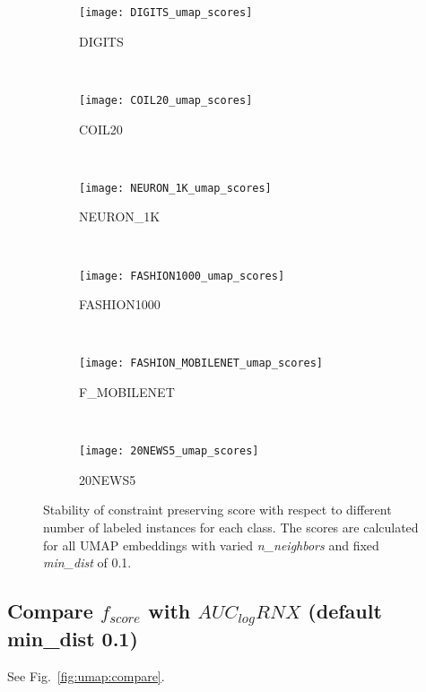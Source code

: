\begin{figure*}[pos=h]
    \centering
    \begin{subfigure}[b]{0.152\textwidth}
        \centering
        \texttt{[image: DIGITS\_umap\_scores]}
        \caption{DIGITS}
    \end{subfigure}
    ~
    \begin{subfigure}[b]{0.152\textwidth}
        \texttt{[image: COIL20\_umap\_scores]}
        \caption{COIL20}
    \end{subfigure}
    ~
    \begin{subfigure}[b]{0.152\textwidth}
        \texttt{[image: NEURON\_1K\_umap\_scores]}
        \caption{NEURON\_1K}
    \end{subfigure}
    ~
    \begin{subfigure}[b]{0.152\textwidth}
        \centering
        \texttt{[image: FASHION1000\_umap\_scores]}
        \caption{FASHION1000}
    \end{subfigure}
    ~
    \begin{subfigure}[b]{0.152\textwidth}
        \texttt{[image: FASHION\_MOBILENET\_umap\_scores]}
        \caption{F\_MOBILENET}
    \end{subfigure}
    ~
    \begin{subfigure}[b]{0.152\textwidth}
        \texttt{[image: 20NEWS5\_umap\_scores]}
        \caption{20NEWS5}
    \end{subfigure}
    \caption{Stability of constraint preserving score with respect to different number of labeled instances for each class. The scores are calculated for all UMAP embeddings with varied \emph{n\_neighbors} and fixed \emph{min\_dist} of 0.1.}
    \label{fig:score:umap:stability:annex}
\end{figure*}


\subsection{Compare $f_{score}$ with $AUC_{log}RNX$ (default min\_dist 0.1)}
See Fig.~\ref{fig:umap:compare}.


